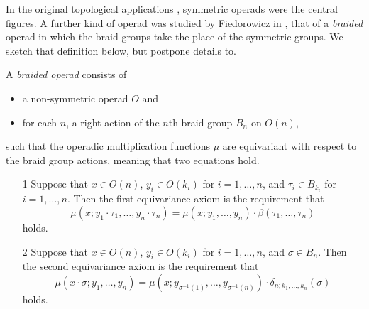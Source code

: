 In the original topological applications \cite{maygeom}, symmetric operads were the central figures. A further kind of operad was studied by Fiedorowicz in \cite{fie-br}, that of a \emph{braided} operad in which the braid groups take the place of the symmetric groups. We sketch that definition below, but postpone details to.

\begin{Defi}\label{Defi:broperad}
A \textit{braided operad} consists of
  \begin{itemize}
    \item a non-symmetric operad $O$ and
    \item for each $n$, a right action of the $n$th braid group $B_{n}$ on $O(n)$,
  \end{itemize}
%  
such that the operadic multiplication functions $\mu$ are equivariant with respect to the braid group actions, meaning that two equations hold.
\begin{itemize}
\item[1] Suppose that $x \in O(n)$, $y_i \in O(k_i)$ for $i = 1, \ldots, n$, and $\tau_i \in B_{k_i}$ for  $i = 1, \ldots, n$. Then the first equivariance axiom is the requirement that
\[
\mu(x;y_1 \cdot \tau_1,\ldots,y_n \cdot \tau_n) = \mu(x;y_1,\ldots,y_n)\cdot \beta(\tau_1,\ldots,\tau_n)
\]
holds.%
\item[2] Suppose that  $x \in O(n)$, $y_i \in O(k_i)$ for $i = 1, \ldots, n$, and $\sigma \in B_{n}$. 
Then the second equivariance axiom is the requirement that
\[
 \mu(x \cdot \sigma; y_1, \ldots, y_n) = \mu\left(x;y_{\sigma^{-1}(1)},\ldots,y_{\sigma^{-1}(n)}\right)\cdot \delta_{n; k_1, \ldots, k_n}(\sigma)
\]
holds.%
\end{itemize}
\end{Defi}

